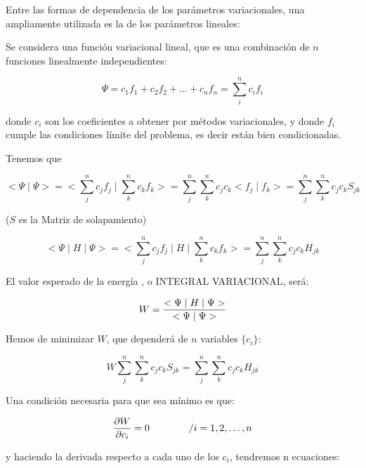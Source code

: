 \documentclass[a4paper,openright,12pt, oneside]{book}
\begin{document}
Entre las formas de dependencia de los par\'ametros variacionales, una ampliamente utilizada es la de los par\'ametros lineales:

Se considera una funci\'on variacional lineal, que es una combinaci\'on de $n$ funciones linealmente independientes:

\begin{displaymath}\Psi = c_{1}f_{1}+ c_{2}f_{2}+ \ldots + c_{n}f_{n}= \sum^{n}_{i}
c_{i}f_{i} \end{displaymath}

donde $c_{i}$ son los coeficientes a obtener por m\'etodos variacionales, y donde $f_{i}$ cumple las condiciones l\'imite del problema, es decir est\'an bien condicionadas.

Tenemos que

\begin{displaymath}
<\Psi \mid \Psi > = < \sum^{n}_{j} c_{j}f_{j}\mid  \sum^{n}_{k}
c_{k}f_{k} > = \sum^{n}_{j} \sum^{n}_{k} c_{j} c_{k} <f_{j}\mid f_{k}> =
\sum^{n}_{j} \sum^{n}_{k} c_{j} c_{k} S_{jk}
\end{displaymath}

($S$ es la Matriz de solapamiento)


\begin{displaymath}
<\Psi \mid H\mid \Psi > = < \sum^{n}_{j} c_{j}f_{j}\mid H\mid
\sum^{n}_{k} c_{k}f_{k} > = \sum^{n}_{j} \sum^{n}_{k} c_{j} c_{k} H_{jk}
\end{displaymath}

El valor esperado de la energ\'ia , o INTEGRAL VARIACIONAL, ser\'a:

\begin{displaymath}W = {<\Psi \mid H\mid \Psi >\over <\Psi \mid \Psi >} \end{displaymath}

Hemos de minimizar $W$, que dependerá de $n$ variables $\{c_{i}\}$:


\begin{displaymath}W \sum^{n}_{j} \sum^{n}_{k} c_{j} c_{k} S_{jk} = \sum^{n}_{j}
\sum^{n}_{k} c_{j} c_{k} H_{jk} \end{displaymath}



Una condici\'on necesaria para que sea m\'inimo es que:

\begin{displaymath}{\partial W\over \partial c_{i}} = 0 \qquad \qquad / i = 1,2,\ldots ,n \end{displaymath}

y haciendo la derivada respecto a cada uno de los $c_{i}$, tendremos n ecuaciones:
\end{document}
